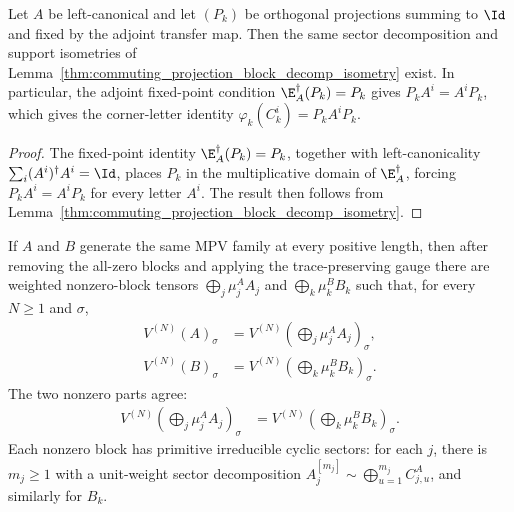 \begin{lemma}%
    \label{thm:adjoint_fixed_projection_block_decomp_isometry}
    \leanok
    Let $A$ be left-canonical and let $(P_k)$ be orthogonal projections
    summing to $\Id$ and fixed by the adjoint transfer map. Then the same
    sector decomposition and support isometries of
    Lemma~\ref{thm:commuting_projection_block_decomp_isometry} exist. In
    particular, the adjoint fixed-point condition
    $\E_A^\dagger(P_k)=P_k$ gives $P_kA^i=A^iP_k$, which gives the
    corner-letter identity $\varphi_k(C_k^i)=P_kA^iP_k$.
    \begin{proof}\leanok
        The fixed-point identity $\E_A^\dagger(P_k)=P_k$, together with
        left-canonicality $\sum_i(A^i)^\dagger A^i=\Id$, places $P_k$ in the
        multiplicative domain of $\E_A^\dagger$, forcing
        $P_kA^i=A^iP_k$ for every letter $A^i$. The result then follows from
        Lemma~\ref{thm:commuting_projection_block_decomp_isometry}.
    \end{proof}
\end{lemma}

\begin{lemma}%
    \label{thm:ft_after_blocking_per_block_cyclic_nonzero_blocks}
    \leanok
    If $A$ and $B$ generate the same MPV family at every positive length, then
    after removing the all-zero blocks and applying the trace-preserving gauge
    there are weighted nonzero-block tensors
    $\bigoplus_j\mu_j^AA_j$ and $\bigoplus_k\mu_k^BB_k$ such that, for every
    $N\ge1$ and $\sigma$,
    \begin{align}
        V^{(N)}(A)_\sigma
         & =
        V^{(N)}\!\left(\bigoplus_j\mu_j^AA_j\right)_\sigma,
        \label{eq:canonical_nonzero_part_a} \\
        V^{(N)}(B)_\sigma
         & =
        V^{(N)}\!\left(\bigoplus_k\mu_k^BB_k\right)_\sigma.
        \label{eq:canonical_nonzero_part_b}
    \end{align}
    The two nonzero parts agree:
    \begin{align}
        V^{(N)}\!\left(\bigoplus_j\mu_j^AA_j\right)_\sigma
         & =
        V^{(N)}\!\left(\bigoplus_k\mu_k^BB_k\right)_\sigma.
        \label{eq:canonical_nonzero_parts_equal}
    \end{align}
    Each nonzero block has primitive irreducible cyclic sectors: for each $j$,
    there is $m_j\ge1$ with a unit-weight sector decomposition
    $A_j^{[m_j]}\sim\bigoplus_{u=1}^{m_j}C^A_{j,u}$, and similarly for $B_k$.
\end{lemma}

